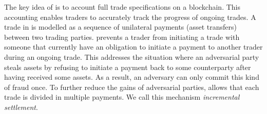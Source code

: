 The key idea of \ModelName{} is to account full trade specifications on a blockchain.
This accounting enables traders to accurately track the progress of ongoing trades.
A trade in \ModelName{} is modelled as a sequence of unilateral payments (asset transfers) between two trading parties.
\ModelName{} prevents a trader from initiating a trade with someone that currently have an obligation to initiate a payment to another trader during an ongoing trade.
This addresses the situation where an adversarial party steals assets by refusing to initiate a payment back to some counterparty after having received some assets.
As a result, an adversary can only commit this kind of fraud once.
To further reduce the gains of adversarial parties, \ModelName{} allows that each trade is divided in multiple payments.
We call this mechanism \emph{incremental settlement}.


